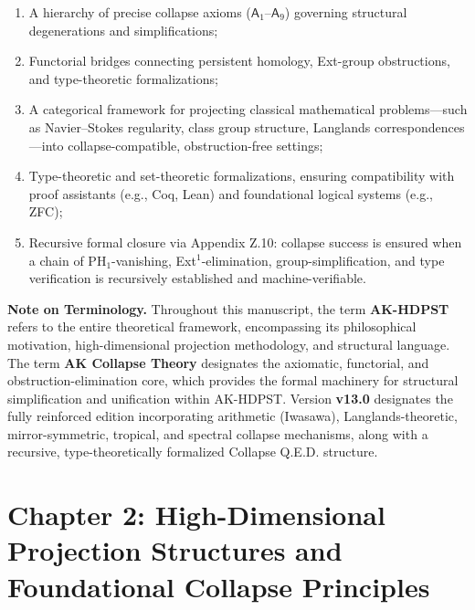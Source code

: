 \documentclass[11pt]{article}
\begin{document}
\begin{enumerate}
    \item A hierarchy of precise collapse axioms ($\mathsf{A}_1$–$\mathsf{A}_9$) governing structural degenerations and simplifications;
    \item Functorial bridges connecting persistent homology, Ext-group obstructions, and type-theoretic formalizations;
    \item A categorical framework for projecting classical mathematical problems—such as Navier–Stokes regularity, class group structure, Langlands correspondences—into collapse-compatible, obstruction-free settings;
    \item Type-theoretic and set-theoretic formalizations, ensuring compatibility with proof assistants (e.g., Coq, Lean) and foundational logical systems (e.g., ZFC);
    \item Recursive formal closure via Appendix Z.10: collapse success is ensured when a chain of PH$_1$-vanishing, Ext$^1$-elimination, group-simplification, and type verification is recursively established and machine-verifiable.
\end{enumerate}

\vspace{1em}
\noindent\textbf{Note on Terminology.}  
Throughout this manuscript, the term \textbf{AK-HDPST} refers to the entire theoretical framework, encompassing its philosophical motivation, high-dimensional projection methodology, and structural language.  
The term \textbf{AK Collapse Theory} designates the axiomatic, functorial, and obstruction-elimination core, which provides the formal machinery for structural simplification and unification within AK-HDPST.  
Version \textbf{v13.0} designates the fully reinforced edition incorporating arithmetic (Iwasawa), Langlands-theoretic, mirror-symmetric, tropical, and spectral collapse mechanisms, along with a recursive, type-theoretically formalized Collapse Q.E.D. structure.




\section{Chapter 2: High-Dimensional Projection Structures and Foundational Collapse Principles}
\end{document}
